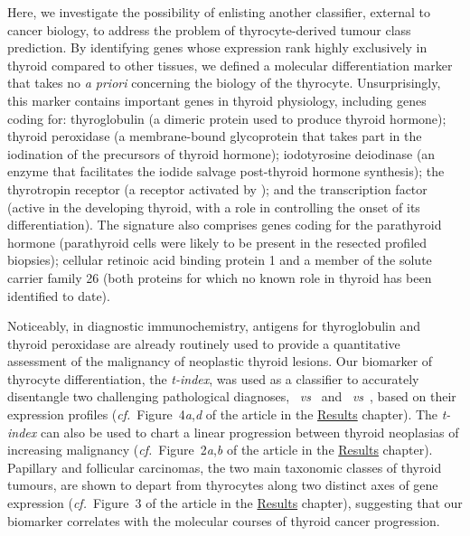 Here, we investigate the possibility of enlisting another classifier, external
to cancer biology, to address the problem of thyrocyte-derived tumour class
prediction.  By identifying genes whose expression rank highly exclusively in
thyroid compared to other tissues, we defined a molecular differentiation marker
that takes no \emph{a priori} concerning the biology of the thyrocyte.
Unsurprisingly, this marker contains important genes in thyroid physiology,
including genes coding for: thyroglobulin (a dimeric protein used to produce
thyroid hormone); thyroid peroxidase (a membrane-bound glycoprotein that takes
part in the iodination of the precursors of thyroid hormone); iodotyrosine
deiodinase (an enzyme that facilitates the iodide salvage post-thyroid hormone
synthesis); the thyrotropin receptor (a receptor activated by );
and the  transcription factor (active in the developing thyroid,
with a role in controlling the onset of its
differentiation\cite{zannini_ttf-2_1997}).  The signature also comprises genes
coding for the parathyroid hormone (parathyroid cells were likely to be present
in the resected profiled biopsies); cellular retinoic acid binding protein 1 and
a member of the solute carrier family 26 (both proteins for which no known role
in thyroid has been identified to date).

Noticeably, in diagnostic immunochemistry, antigens for thyroglobulin and
thyroid peroxidase are already routinely used to provide a quantitative
assessment of the malignancy of neoplastic thyroid
lesions.\cite{tanaka_immunohistochemical_1996,gerard_correlation_2003} Our
biomarker of thyrocyte differentiation, the \emph{t-index}, was used as a
classifier to accurately disentangle two challenging pathological diagnoses,
\mbox{ \emph{vs} } and \mbox{
  \emph{vs} }, based on their expression profiles
(\mbox{\emph{cf.}  Figure~4\emph{a},\emph{d}} of the article in the
\hyperref[chap:results]{\textsf{Results}} chapter).  The \emph{t-index} can also
be used to chart a linear progression between thyroid neoplasias of increasing
malignancy (\mbox{\emph{cf.}  Figure~2\emph{a},\emph{b}} of the article in the
\hyperref[chap:results]{\textsf{Results}} chapter).  Papillary and follicular
carcinomas, the two main taxonomic classes of thyroid tumours, are shown to
depart from thyrocytes along two distinct axes of gene expression
(\mbox{\emph{cf.} Figure~3} of the article in the
\hyperref[chap:results]{\textsf{Results}} chapter), suggesting that our
biomarker correlates with the molecular courses of thyroid cancer progression.

